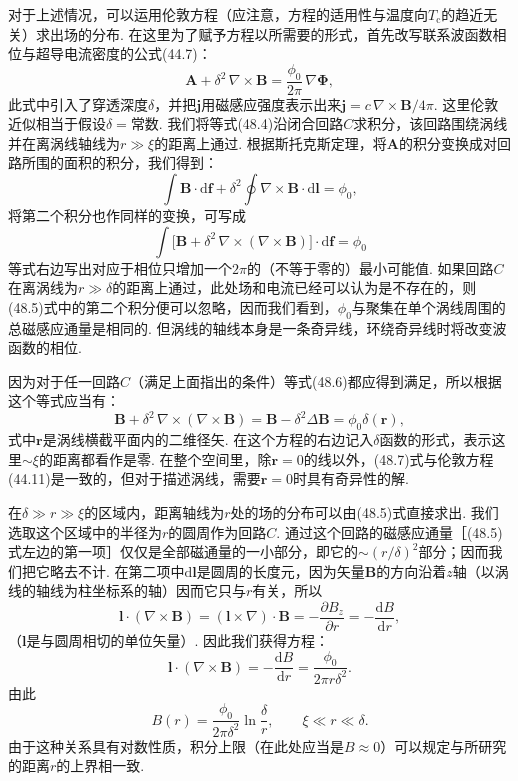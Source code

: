 对于上述情况，可以运用伦敦方程（应注意，方程的适用性与温度向$T_{\mathrm{c}}$的趋近无关）求出场的分布. 在这里为了赋予方程以所需要的形式，首先改写联系波函数相位与超导电流密度的公式(44.7)：
\begin{equation}
\bm{A}+\delta^2\,\nabla\times\bm{B}=\frac{\phi_0}{2\pi}\,\nabla\bm{\Phi},
\end{equation}
此式中引入了穿透深度$\delta$，并把$\bm{j}$用磁感应强度表示出来$\bm{j}=c\,\nabla\times\bm{B}/4\pi$. 这里伦敦近似相当于假设$\delta=$常数. 我们将等式(48.4)沿闭合回路$C$求积分，该回路围绕涡线并在离涡线轴线为$r\gg\xi$的距离上通过. 根据斯托克斯定理，将$\bm{A}$的积分变换成对回路所围的面积的积分，我们得到：
\begin{equation}
\int\bm{B}\cdot\mathrm{d}\bm{f}+\delta^2\oint\nabla\times\bm{B}\cdot\mathrm{d}\bm{l}=\phi_0,
\end{equation}
将第二个积分也作同样的变换，可写成
\begin{equation}
\int\bigl[\bm{B}+\delta^2\,\nabla\times(\nabla\times\bm{B})\bigr]\cdot\mathrm{d}\bm{f}=\phi_0
\end{equation}
等式右边写出对应于相位只增加一个$2\pi$的（不等于零的）最小可能值. 如果回路$C$在离涡线为$r\gg\delta$的距离上通过，此处场和电流已经可以认为是不存在的，则(48.5)式中的第二个积分便可以忽略，因而我们看到，$\phi_0$与聚集在单个涡线周围的总磁感应通量是相同的. 但涡线的轴线本身是一条奇异线，环绕奇异线时将改变波函数的相位.

因为对于任一回路$C$（满足上面指出的条件）等式(48.6)都应得到满足，所以根据这个等式应当有：
\begin{equation}
\bm{B}+\delta^2\,\nabla\times(\nabla\times\bm{B})
=\bm{B}-\delta^2\Delta\bm{B}=\phi_0\delta(\bm{r}),
\end{equation}
式中$\bm{r}$是涡线横截平面内的二维径矢. 在这个方程的右边记入$\delta$函数的形式，表示这里$\sim\xi$的距离都看作是零. 在整个空间里，除$\bm{r}=0$的线以外，(48.7)式与伦敦方程(44.11)是一致的，但对于描述涡线，需要$\bm{r}=0$时具有奇异性的解.

在$\delta\gg r\gg\xi$的区域内，距离轴线为$r$处的场的分布可以由(48.5)式直接求出. 我们选取这个区域中的半径为$r$的圆周作为回路$C$. 通过这个回路的磁感应通量［(48.5)式左边的第一项］仅仅是全部磁通量的一小部分，即它的$\sim(r/\delta)^2$部分；因而我们把它略去不计. 在第二项中$\mathrm{d}\bm{l}$是圆周的长度元，因为矢量$\bm{B}$的方向沿着$z$轴（以涡线的轴线为柱坐标系的轴）因而它只与$r$有关，所以
\begin{equation*}
\bm{l}\cdot(\nabla\times\bm{B})=(\bm{l}\times\nabla)\cdot\bm{B}
=-\frac{\partial B_z}{\partial r}=-\frac{\mathrm{d}B}{\mathrm{d}r},
\end{equation*}
（$\bm{l}$是与圆周相切的单位矢量）. 因此我们获得方程：
\begin{equation}
\bm{l}\cdot(\nabla\times\bm{B})=-\frac{\mathrm{d}B}{\mathrm{d}r}
=\frac{\phi_0}{2\pi r\delta^2}.
\end{equation}
由此
\begin{equation}
B(r)=\frac{\phi_0}{2\pi\delta^2}\ln\frac{\delta}{r},\qquad \xi\ll r\ll\delta.
\end{equation}
由于这种关系具有对数性质，积分上限（在此处应当是$B\approx0$）可以规定与所研究的距离$r$的上界相一致.

